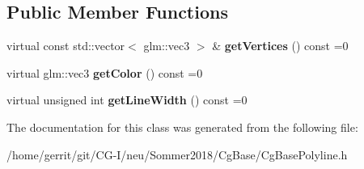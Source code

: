 \subsection*{Public Member Functions}
\begin{DoxyCompactItemize}
\item 
\mbox{\label{class_cg_base_polyline_a44cff1d122279cb9f63dd8ad2ed3ea9d}} 
virtual const std\+::vector$<$ glm\+::vec3 $>$ \& {\bfseries get\+Vertices} () const =0
\item 
\mbox{\label{class_cg_base_polyline_a5c608b413ecf88731029f0a108a7330e}} 
virtual glm\+::vec3 {\bfseries get\+Color} () const =0
\item 
\mbox{\label{class_cg_base_polyline_a6009744baceea33d72e2930edc005e11}} 
virtual unsigned int {\bfseries get\+Line\+Width} () const =0
\end{DoxyCompactItemize}


The documentation for this class was generated from the following file\+:\begin{DoxyCompactItemize}
\item 
/home/gerrit/git/\+C\+G-\/\+I/neu/\+Sommer2018/\+Cg\+Base/Cg\+Base\+Polyline.\+h\end{DoxyCompactItemize}
